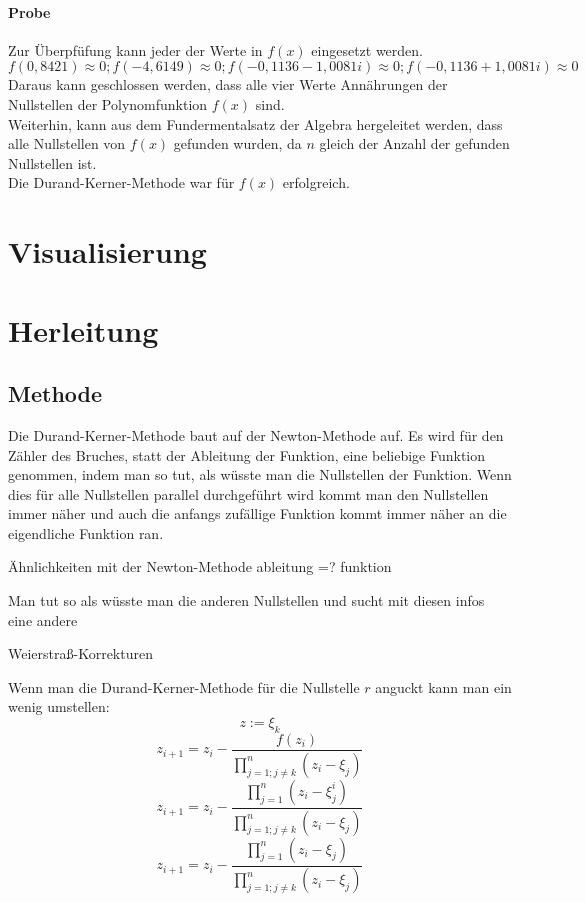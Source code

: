 \documentclass[12pt]{article}
\begin{document}
\paragraph{Probe}
Zur Überpfüfung kann jeder der Werte in $f(x)$ eingesetzt werden.
\begin{displaymath}
    f(0,8421) \approx 0; f(-4,6149) \approx 0; f(-0,1136 - 1,0081i) \approx 0; f(-0,1136 + 1,0081i) \approx 0
\end{displaymath}
Daraus kann geschlossen werden, dass alle vier Werte Annährungen der Nullstellen der Polynomfunktion $f(x)$ sind. \\
Weiterhin, kann aus dem Fundermentalsatz der Algebra hergeleitet werden, dass alle Nullstellen von $f(x)$ gefunden wurden, da $n$ gleich der Anzahl der gefunden Nullstellen ist. \\
Die Durand-Kerner-Methode war für $f(x)$ erfolgreich.

\section{Visualisierung}

\section{Herleitung}
\subsection{Methode}
Die Durand-Kerner-Methode baut auf der Newton-Methode auf. Es wird für den Zähler des Bruches, statt der Ableitung der Funktion, eine beliebige Funktion genommen, indem man so tut, als wüsste man die Nullstellen der Funktion. Wenn dies für alle Nullstellen parallel durchgeführt wird kommt man den Nullstellen immer näher und auch die anfangs zufällige Funktion kommt immer näher an die eigendliche Funktion ran.

Ähnlichkeiten mit der Newton-Methode
ableitung =? funktion

Man tut so als wüsste man die anderen Nullstellen und sucht mit diesen infos eine andere

Weierstraß-Korrekturen

Wenn man die Durand-Kerner-Methode für die Nullstelle $r$ anguckt kann man ein wenig umstellen:
\begin{displaymath}
    z := \xi_k
\end{displaymath}
\begin{displaymath}
    z_{i+1} = z_i - \frac{f(z_i)}{\prod_{j=1;j\neq k}^n (z_i-\xi_j)}
\end{displaymath}
\begin{displaymath}
    z_{i+1} = z_i - \frac{\prod_{j=1}^n (z_i-\xi_j^i)}{\prod_{j=1;j\neq k}^n (z_i-\xi_j)}
\end{displaymath}
\begin{displaymath}
    z_{i+1} = z_i - \frac{\prod_{j=1}^n (z_i-\xi_j)}{\prod_{j=1;j\neq k}^n (z_i-\xi_j)}
\end{displaymath}
\end{document}
